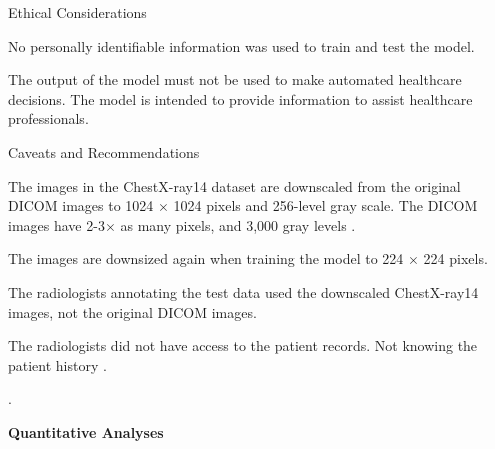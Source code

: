 \documentclass{article}
\begin{document}
\begin{adjustwidth}{-60pt}{-30pt}
\begin{singlespace}
\begin{tcolorbox}[title=\textbf{Model Card - CheXNet},
    breakable, sharp corners, boxrule=0.7pt]
{\begin{mcsection}{Ethical Considerations}
    \item No personally identifiable information was used to train and test the model.
    \item The output of the model must not be used to make automated healthcare decisions. The model is intended to provide information to assist healthcare professionals.
\end{mcsection}

\begin{mcsection}{Caveats and Recommendations}
    \item The images in the ChestX-ray14 dataset are downscaled from the original DICOM images to 1024 $\times$ 1024 pixels and 256-level gray scale. The DICOM images  have 2-3$\times$ as many pixels, and 3,000 gray levels \cite{Wang2017} \cite{OakdenRayner2018a}.
    \item The images are downsized again when training the model to 224 $\times$ 224 pixels.
    \item The radiologists annotating the test data used the downscaled ChestX-ray14 images, not the original DICOM images.
    \item The radiologists did not have access to the patient records. Not knowing the patient history  \cite{Rajpurkar2017}.
    \item {}. \cite{Rajpurkar2017}
\end{mcsection}

\textbf{Quantitative Analyses}

}
\end{tcolorbox}
\end{singlespace}
\end{adjustwidth}
\end{document}
